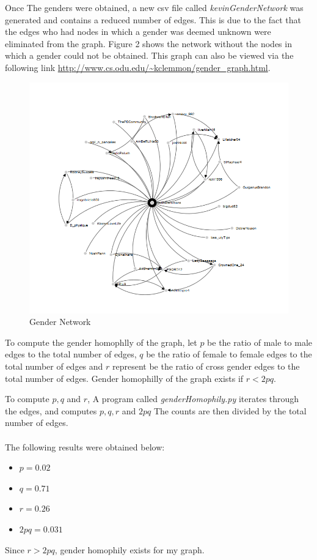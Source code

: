 \documentclass[12pt,letterpaper]{article}
\begin{document}
Once The genders were obtained, a new csv file called {\it kevinGenderNetwork} was generated and contains a reduced number of edges. This is due to the fact that the edges who had nodes in which a gender was deemed unknown were eliminated from the graph. Figure 2 shows the network without the nodes in which a gender could not be obtained. This graph can also be viewed via the following link \url{http://www.cs.odu.edu/~kclemmon/gender_graph.html}.
\newpage 
\begin{figure}[ht!]
\centering 
\includegraphics[scale=0.55]{genderGraph}
\caption{Gender Network}
\label{overflow}
\end{figure}

To compute the gender homophlly of the graph, let $p$ be the ratio of male to male edges to the total number of edges, $q$ be the ratio of female to female edges to the total number of edges and $r$ represent be the ratio of cross gender edges to the total number of edges. Gender homophilly of the graph exists if $r < 2pq$\cite{michaelnelson}. 

To compute $p,q$ and $r$, A program called {\it genderHomophily.py} iterates through the edges, and computes $p,q,r$ and $2pq$ The counts are then divided by the total number of edges. \\ \\ The following results were obtained below: 
\begin{itemize}
    \item $p = 0.02$ 
    \item $q = 0.71$
    \item $r = 0.26$
    \item $2pq = 0.031$
\end{itemize}
\newpage 
Since $r > 2pq$, gender homophily exists for my graph. 
\printbibliography
\end{document}

